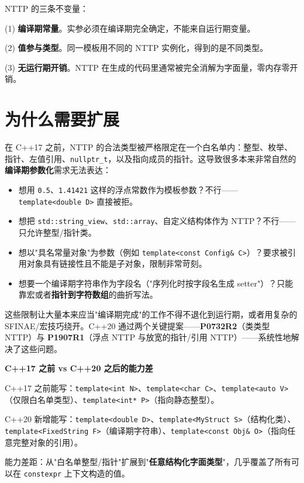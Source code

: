 \documentclass[12pt,a4paper,fontset=fandol]{ctexbook}
\newcommand{\cpp}[1]{C++#1}
\newcommand{\kw}[1]{\texttt{#1}}
\begin{document}
\begin{guideline}
NTTP 的三条不变量：

(1) \textbf{编译期常量}。实参必须在编译期完全确定，不能来自运行期变量。

(2) \textbf{值参与类型}。同一模板用不同的 NTTP 实例化，得到的是不同类型。

(3) \textbf{无运行期开销}。NTTP 在生成的代码里通常被完全消解为字面量，零内存零开销。
\end{guideline}

\section{为什么需要扩展}

在 \cpp{17} 之前，NTTP 的合法类型被严格限定在一个白名单内：整型、枚举、指针、左值引用、\kw{nullptr\_t}，以及指向成员的指针。这导致很多本来非常自然的\textbf{编译期参数化}需求无法表达：

\begin{itemize}
  \item 想用 \kw{0.5}、\kw{1.41421} 这样的浮点常数作为模板参数？不行——\kw{template<double D>} 直接被拒。
  \item 想把 \kw{std::string\_view}、\kw{std::array}、自定义结构体作为 NTTP？不行——只允许整型/指针类。
  \item 想以"具名常量对象"为参数（例如 \kw{template<const Config\& C>}）？要求被引用对象具有链接性且不能是子对象，限制非常苛刻。
  \item 想要一个编译期字符串作为字段名（"序列化时按字段名生成 setter"）？只能靠宏或者\textbf{指针到字符数组}的曲折写法。
\end{itemize}

这些限制让大量本来应当"编译期完成"的工作不得不退化到运行期，或者用复杂的 SFINAE/宏技巧绕开。\cpp{20} 通过两个关键提案——\textbf{P0732R2}（类类型 NTTP）与 \textbf{P1907R1}（浮点 NTTP 与放宽的指针/引用 NTTP）——系统性地解决了这些问题。

\begin{compare}
\textbf{\cpp{17} 之前 vs \cpp{20} 之后的能力差}

\cpp{17} 之前能写：\kw{template<int N>}、\kw{template<char C>}、\kw{template<auto V>}（仅限白名单类型）、\kw{template<int* P>}（指向静态整型）。

\cpp{20} 新增能写：\kw{template<double D>}、\kw{template<MyStruct S>}（结构化类）、\kw{template<FixedString F>}（编译期字符串）、\kw{template<const Obj\& O>}（指向任意完整对象的引用）。

能力差距：从"白名单整型/指针"扩展到"\textbf{任意结构化字面类型}"，几乎覆盖了所有可以在 \kw{constexpr} 上下文构造的值。
\end{compare}
\end{document}
